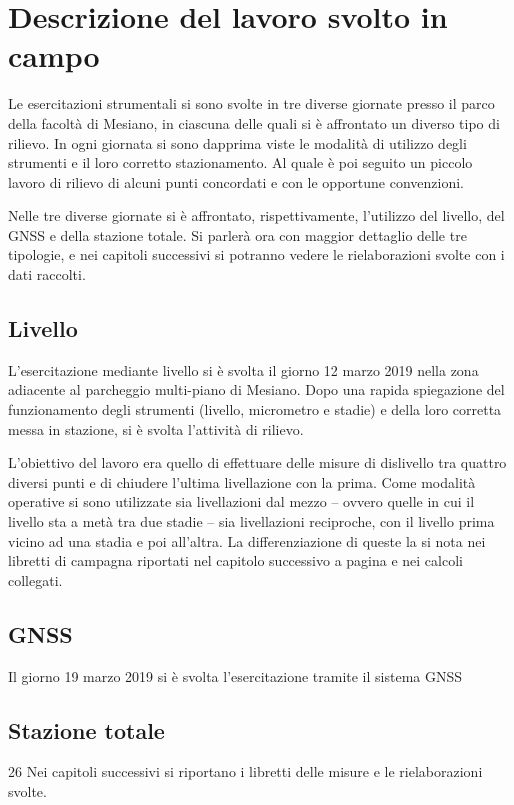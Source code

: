 \chapter{Descrizione del lavoro svolto in campo}
Le esercitazioni strumentali si sono svolte in tre diverse giornate presso il  parco della facoltà di Mesiano, in ciascuna delle quali si è affrontato un diverso tipo di rilievo.
In ogni giornata si sono dapprima viste le modalità di utilizzo degli strumenti e il loro corretto stazionamento.
Al quale è poi seguito un piccolo lavoro di rilievo di alcuni punti concordati e con le opportune convenzioni.

Nelle tre diverse giornate si è affrontato, rispettivamente, l'utilizzo del livello, del GNSS e della stazione totale. 
Si parlerà ora con maggior dettaglio delle tre tipologie, e nei capitoli successivi si potranno vedere le rielaborazioni svolte con i dati raccolti.
\section{Livello}
L'esercitazione mediante livello si è svolta il giorno 12 marzo 2019 nella zona adiacente al parcheggio multi-piano di Mesiano.
Dopo una rapida spiegazione del funzionamento degli strumenti (livello, micrometro e stadie) e della loro corretta messa in stazione, si è svolta l'attività di rilievo. 

L'obiettivo del lavoro era quello di effettuare delle misure di dislivello tra quattro diversi punti e di chiudere l'ultima livellazione con la prima.  
Come modalità operative si sono utilizzate sia livellazioni dal mezzo -- ovvero quelle in cui il livello sta a metà tra due stadie -- sia livellazioni reciproche, con il livello prima vicino ad una stadia e poi all'altra.
La differenziazione di queste la si nota nei libretti di campagna riportati nel  capitolo successivo a pagina \pageref{misc:cap2} e nei calcoli collegati.  
\section{GNSS}
Il giorno 19 marzo 2019 si è svolta l'esercitazione tramite il sistema GNSS 
\section{Stazione totale}
26 
Nei capitoli successivi si riportano i libretti delle misure e le rielaborazioni svolte.